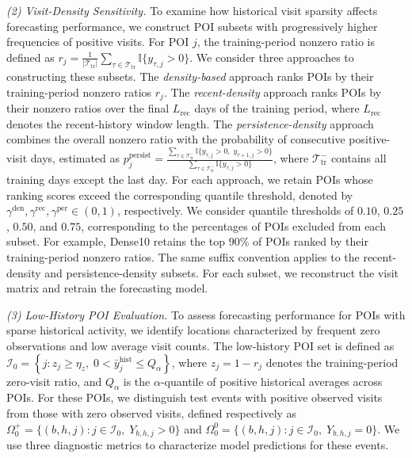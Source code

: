 \documentclass[preprint,authoryear,11pt]{elsarticle}
\theoremstyle{definition}
\begin{document}
\textit{(2) Visit-Density Sensitivity.}
To examine how historical visit sparsity affects forecasting performance, we construct POI subsets with progressively higher frequencies of positive visits.
For POI \(j\), the training-period nonzero ratio is defined as
\(
r_j=
\frac{1}{|\mathcal{T}_{\mathrm{tr}}|}
\sum_{\tau\in\mathcal{T}_{\mathrm{tr}}}
\mathbb{I}\{y_{\tau,j}>0\}.
\)
We consider three approaches to constructing these subsets.
The \textit{density-based} approach ranks POIs by their training-period nonzero ratios \(r_j\).
The \textit{recent-density} approach ranks POIs by their nonzero ratios over the final \(L_{\mathrm{rec}}\) days of the training period, where \(L_{\mathrm{rec}}\) denotes the recent-history window length.
The \textit{persistence-density} approach combines the overall nonzero ratio with the probability of consecutive positive-visit days, estimated as \(p_j^{\mathrm{persist}}=\frac{\sum_{\tau\in\mathcal{T}_{\mathrm{tr}}^{-}}\mathbb{I}\{y_{\tau,j}>0,\;y_{\tau+1,j}>0\}}{\sum_{\tau\in\mathcal{T}_{\mathrm{tr}}^{-}}\mathbb{I}\{y_{\tau,j}>0\}}\), where \(\mathcal{T}_{\mathrm{tr}}^{-}\) contains all training days except the last day.
For each approach, we retain POIs whose ranking scores exceed the corresponding quantile threshold, denoted by \(\gamma^{\mathrm{den}},\gamma^{\mathrm{rec}},\gamma^{\mathrm{per}}\in(0,1)\), respectively.
We consider quantile thresholds of \(0.10\), \(0.25\), \(0.50\), and \(0.75\), corresponding to the percentages of POIs excluded from each subset.
For example, Dense10 retains the top \(90\%\) of POIs ranked by their training-period nonzero ratios.
The same suffix convention applies to the recent-density and persistence-density subsets.
For each subset, we reconstruct the visit matrix and retrain the forecasting model.

\textit{(3) Low-History POI Evaluation.}
To assess forecasting performance for POIs with sparse historical activity, we identify locations characterized by frequent zero observations and low average visit counts.
The low-history POI set is defined as
\(\mathcal{I}_{0}=\left\{j:z_j\geq\eta_z,\;0<\bar y_j^{\mathrm{hist}}\leq Q_{\alpha}\right\}\),
where \(z_j=1-r_j\) denotes the training-period zero-visit ratio, and \(Q_{\alpha}\) is the \(\alpha\)-quantile of positive historical averages across POIs.
For these POIs, we distinguish test events with positive observed visits from those with zero observed visits, defined respectively as
\(\Omega_0^+=\{(b,h,j):j\in\mathcal{I}_0,\;Y_{b,h,j}>0\}\)
and
\(\Omega_0^0=\{(b,h,j):j\in\mathcal{I}_0,\;Y_{b,h,j}=0\}\).
We use three diagnostic metrics to characterize model predictions for these events.
\end{document}
